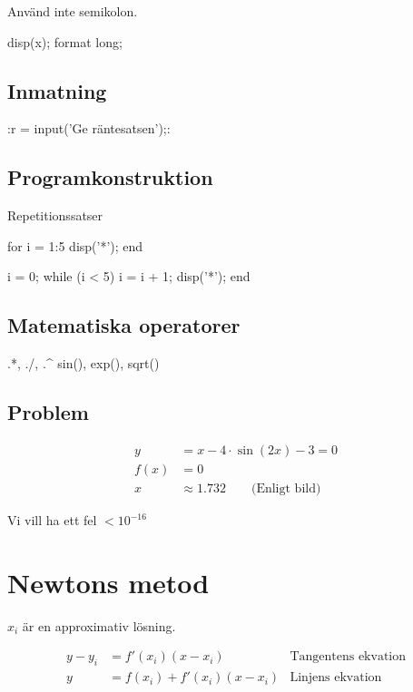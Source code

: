 \documentclass[a4paper,10pt,swedish]{memoir}
\numberwithin{equation}{subsection}
\begin{document}
Använd inte semikolon.

\begin{matlabcode}
disp(x); %
format long;
\end{matlabcode}

\subsection{Inmatning}
\matlab:r = input('Ge räntesatsen');:

\subsection{Programkonstruktion}
Repetitionssatser

\begin{matlabcode}
for i = 1:5
    disp('*');
end

i = 0;
while (i < 5)
    i = i + 1;
    disp('*');
end
\end{matlabcode}

\subsection{Matematiska operatorer}

\begin{matlabcode}
.*, ./, .^
sin(), exp(), sqrt()
\end{matlabcode}

\subsection*{Problem}

\begin{align}
y&=x-4\cdot\sin\left(2x\right)-3=0\\
f(x)&=0\\
x&\approx 1.732 \qquad\text{(Enligt bild)}
\end{align}

Vi vill ha ett fel $<10^{-16}$

\section{Newtons metod}

$x_i$ är en approximativ lösning.

\begin{align}
y-y_i &= f'(x_i)(x-x_i) &\text{Tangentens ekvation}\\
y&=f(x_i)+f'(x_i)(x-x_i) &\text{Linjens ekvation}
\end{align}
\end{document}
